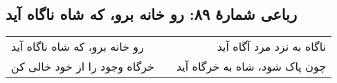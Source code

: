 \begin{center}
\section*{رباعی شمارهٔ ۸۹: رو خانه برو، که شاه ناگاه آید}
\label{sec:089}
\begin{longtable}{l p{0.5cm} r}
رو خانه برو، که شاه ناگاه آید
&&
ناگاه به نزد مرد آگاه آید
\\
خرگاه وجود را از خود خالی کن
&&
چون پاک شود، شاه به خرگاه آید
\\
\end{longtable}
\end{center}
